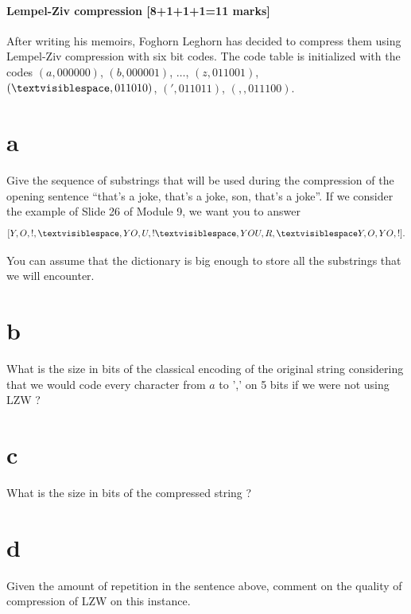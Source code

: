 \documentclass[12pt]{article}
\newcommand{\vs}{\textvisiblespace}
\begin{document}
\subsection{Lempel-Ziv compression [8+1+1+1=11 marks]} 
After writing his memoirs, Foghorn Leghorn has decided to compress them 
using Lempel-Ziv compression with six bit codes. 
The code table is initialized with the codes 
$(a,000000)$, $(b,000001)$, $\dots$, $(z,011001)$, $({\vs},011010)$, 
$(',011011)$, $(, ,011100)$.
\begin{enumerate}
\part{a}Give the sequence of substrings that will be used during the compression 
of the opening sentence ``that's a joke, that's a joke, son, that's a joke''.
If we consider the example of Slide 26 of Module 9, we want you to answer 
$$[Y,O,!,{\vs},YO,U,!{\vs},YOU,R,{\vs}Y,O,YO,!].$$

You can assume that the dictionary is big enough to store 
all the substrings that we will encounter.

\part{b} What is the size in bits of the classical encoding of the original string considering that we would code every character from $a$ to ',' on 5 bits if we were not using LZW  ? 

\part{c} What is the size in bits of the compressed string ?

\part{d} Given the amount of repetition in the sentence above, comment on the quality of compression of LZW on this instance.

\end{enumerate}
\end{document}
